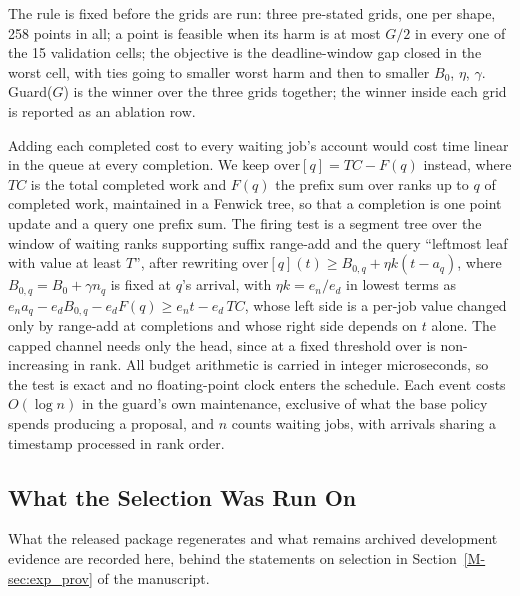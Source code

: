\documentclass[mathematics,supfile,submit,moreauthors]{Definitions/mdpi}
\newcommand{\devnum}[1]{#1}
\begin{document}
The rule is fixed before the grids are run: three
pre-stated grids, one per shape, \devnum{258} points in all; a point is feasible when
its harm is at most $G/2$ in every one of the \devnum{15} validation cells; the
objective is the deadline-window gap closed in the worst cell, with ties going to
smaller worst harm and then to smaller $B_0$, $\eta$, $\gamma$. Guard($G$) is the
winner over the three grids together; the winner inside each grid is reported as an
ablation row.

Adding each completed cost to every waiting job's account would cost time linear in the
queue at every completion. We keep
$\mathrm{over}[q] = TC - F(q)$ instead, where $TC$ is the total completed work and
$F(q)$ the prefix sum over ranks up to $q$ of completed work, maintained in a Fenwick
tree, so that a completion is one point update and a query one prefix sum. The firing
test is a segment tree over the window of waiting ranks supporting suffix range-add
and the query ``leftmost leaf with value at least $T$'', after rewriting
$\mathrm{over}[q](t) \ge B_{0,q} + \eta k (t - a_q)$, where $B_{0,q} = B_0 + \gamma n_q$
is fixed at $q$'s arrival, with $\eta k = e_n/e_d$ in lowest terms as
$e_n a_q - e_d B_{0,q} - e_d F(q) \ge e_n t - e_d\, TC$,
whose left side is a per-job value changed only by range-add at completions and whose
right side depends on $t$ alone. The capped channel needs only the head, since at a
fixed threshold $\mathrm{over}$ is non-increasing in rank. All budget arithmetic is
carried in integer microseconds, so the test is exact and no floating-point clock
enters the schedule. Each event costs $O(\log n)$ in the guard's own maintenance,
exclusive of what the base policy spends producing a proposal, and $n$ counts
waiting jobs, with arrivals sharing a timestamp processed in rank order.

\subsection{What the Selection Was Run On}
\label{sec:supp_selection_scope}

What the released package regenerates and what remains archived development evidence are
recorded here, behind the statements on selection in Section~\ref*{M-sec:exp_prov} of the
manuscript.
\end{document}
